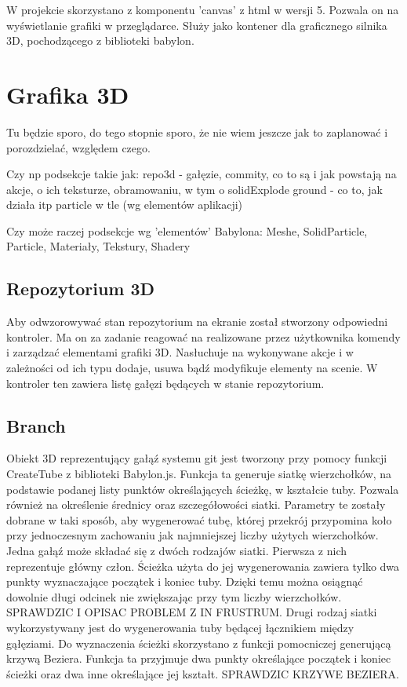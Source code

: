 \documentclass[11pt,a4paper,polish,thesis]{dcsbook}
\begin{document}
	W projekcie skorzystano z komponentu 'canvas' z html w wersji 5. Pozwala on na wyświetlanie grafiki w przeglądarce. Służy jako kontener dla graficznego silnika 3D, pochodzącego z biblioteki babylon. 
	
	\section{Grafika 3D}
	Tu będzie sporo, do tego stopnie sporo, że nie wiem jeszcze jak to zaplanować i porozdzielać, względem czego.
	
	Czy np podsekcje takie jak:
	repo3d - gałęzie, commity, co to są i jak powstają na akcje, o ich teksturze, obramowaniu, w tym o solidExplode
	ground - co to, jak działa itp
	particle w tle
	(wg elementów aplikacji)
	
	Czy może raczej podsekcje wg 'elementów' Babylona:
	Meshe, SolidParticle, Particle, Materiały, Tekstury, Shadery
	
	

	\subsection{Repozytorium 3D}
		Aby odwzorowywać stan repozytorium na ekranie został stworzony odpowiedni kontroler. Ma on za zadanie reagować na realizowane przez użytkownika komendy i zarządzać elementami grafiki 3D. Nasłuchuje na wykonywane akcje i w zależności od ich typu dodaje, usuwa bądź modyfikuje elementy na scenie. W kontroler ten zawiera listę gałęzi będących w stanie repozytorium. %

	\subsection{Branch}
	Obiekt 3D reprezentujący gałąź systemu git jest tworzony przy pomocy funkcji CreateTube z biblioteki Babylon.js. 
	Funkcja ta generuje siatkę wierzchołków, na podstawie podanej listy punktów określających ścieżkę, w kształcie tuby. Pozwala również na określenie średnicy oraz
	szczegółowości siatki. Parametry te zostały dobrane w taki sposób, aby wygenerować tubę, której przekrój przypomina koło przy jednoczesnym zachowaniu jak najmniejszej liczby użytych wierzchołków. Jedna gałąź może składać się z dwóch rodzajów siatki. Pierwsza z nich reprezentuje główny człon. Ścieżka użyta do jej wygenerowania zawiera tylko dwa punkty wyznaczające początek i koniec tuby. Dzięki temu można osiągnąć dowolnie długi odcinek nie zwiększając przy tym liczby wierzchołków. SPRAWDZIC I OPISAC PROBLEM Z IN FRUSTRUM. Drugi rodzaj siatki wykorzystywany jest do wygenerowania tuby będącej łącznikiem między gąłęziami. Do wyznaczenia ścieżki skorzystano z funkcji pomocniczej generującą krzywą Beziera. Funkcja ta przyjmuje dwa punkty określające początek i koniec ścieżki oraz dwa inne określające jej kształt. SPRAWDZIC KRZYWE BEZIERA. 
\end{document}
